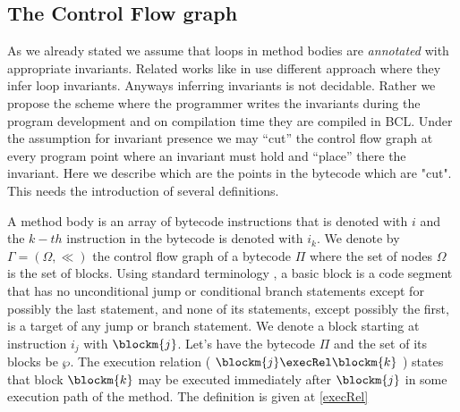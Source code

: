 
\subsection{The Control Flow graph}\label{abstrCntrFlow}
As we  already stated we assume that loops in method bodies are  \textit{annotated} with appropriate invariants. 
Related works like in \cite{WildmoserN-ESOP05} use different approach where they infer loop invariants. Anyways inferring invariants is not decidable. 
Rather we propose the scheme where the programmer writes the invariants during the program development  
and on compilation time they are compiled in BCL. Under the assumption for invariant presence we may ``cut'' the control flow graph at every program point
where an invariant must hold and ``place'' there the invariant. Here we describe which are the points in the bytecode which are "cut". This needs the introduction
of several definitions.
     
 A method body is an array of bytecode instructions that is denoted with $i$ and the $k-th$ instruction
 in the bytecode is  denoted with $i_{k}$.
 We denote by $\Gamma  = ( \Omega, \ll)$ the control flow graph of a
bytecode $\Pi$ where the set of nodes $\Omega$ is the set of
blocks. Using standard terminology \cite{ARUCom1986}, a
basic block is a code segment that has no unconditional jump or
conditional branch statements except for possibly the last
statement, and none of its statements, except possibly the first,
is a target of any jump or branch statement. 
 We denote a block starting at instruction  $i_{j}$ with $\blockm{j}$. Let's have 
the bytecode $\Pi$ and the set of its blocks be $\wp$. The execution relation ( $\blockm{j} \execRel \blockm{k}$ ) states that block
$ \blockm{k}$ may be executed immediately after $\blockm{j}$ in some execution path of the method. 
The  definition is given at \ref{execRel}

